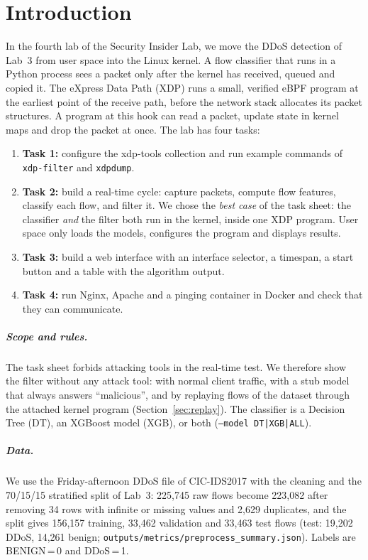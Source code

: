 \chapter{Introduction}\label{chap:introduction}

In the fourth lab of the Security Insider Lab, we move the DDoS detection of Lab~3 from user space into the Linux kernel. A flow classifier that runs in a Python process sees a packet only after the kernel has received, queued and copied it. The eXpress Data Path (XDP) \cite{hoiland2018xdp} runs a small, verified eBPF program at the earliest point of the receive path, before the network stack allocates its packet structures. A program at this hook can read a packet, update state in kernel maps and drop the packet at once. The lab has four tasks:

\begin{enumerate}\setlength\itemsep{0pt}
	\item \textbf{Task 1:} configure the xdp-tools collection \cite{xdptools_github} and run example commands of \texttt{xdp-filter} and \texttt{xdpdump}.
	\item \textbf{Task 2:} build a real-time cycle: capture packets, compute flow features, classify each flow, and filter it. We chose the \emph{best case} of the task sheet: the classifier \emph{and} the filter both run in the kernel, inside one XDP program. User space only loads the models, configures the program and displays results.
	\item \textbf{Task 3:} build a web interface with an interface selector, a timespan, a start button and a table with the algorithm output.
	\item \textbf{Task 4:} run Nginx, Apache and a pinging container in Docker and check that they can communicate.
\end{enumerate}

\paragraph{Scope and rules.} The task sheet forbids attacking tools in the real-time test. We therefore show the filter without any attack tool: with normal client traffic, with a stub model that always answers \enquote{malicious}, and by replaying flows of the dataset through the attached kernel program (Section~\ref{sec:replay}). The classifier is a Decision Tree (DT), an XGBoost model (XGB), or both (\texttt{--model DT|XGB|ALL}).

\paragraph{Data.} We use the Friday-afternoon DDoS file of CIC-IDS2017 \cite{sharafaldin2018cicids} with the cleaning and the 70/15/15 stratified split of Lab~3: 225,745 raw flows become 223,082 after removing 34 rows with infinite or missing values and 2,629 duplicates, and the split gives 156,157 training, 33,462 validation and 33,463 test flows (test: 19,202 DDoS, 14,261 benign; \texttt{outputs/metrics/preprocess\_summary.json}). Labels are BENIGN\,=\,0 and DDoS\,=\,1.

